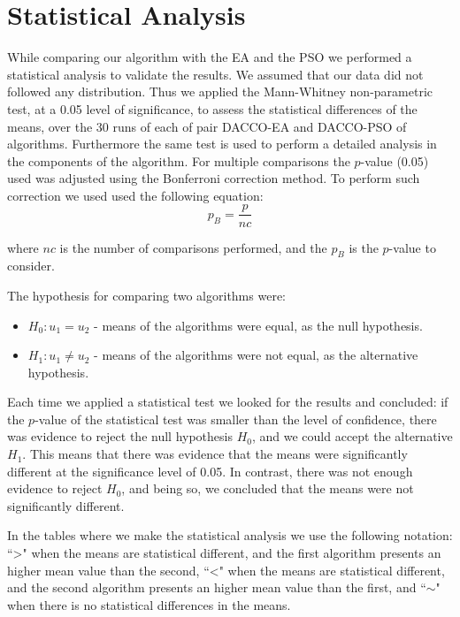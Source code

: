 \section*{Statistical Analysis}
\label{sec:statistical_analysis}
While comparing our algorithm with the EA and the PSO we performed a statistical analysis to validate the results. We assumed that our data did not followed any distribution. Thus we applied the Mann-Whitney non-parametric test, at a 0.05 level of significance, to assess the statistical differences of the means, over the 30 runs of each of pair DACCO-EA and DACCO-PSO of algorithms. Furthermore the same test is used to perform a detailed analysis in the components of the algorithm. For multiple comparisons the $p$-value (0.05) used was adjusted using the Bonferroni correction method. To perform such correction we used used the following equation:
\begin{equation}
	p_B = \frac{p} {nc}
\end{equation}

where $nc$ is the number of comparisons performed, and the $p_B$ is the $p$-value to consider.

The hypothesis for comparing two algorithms were:
\begin{itemize}
	\item $H_{0} : u_1 = u_2$ - means of the algorithms were equal, as the null hypothesis.
	\item $H_{1} : u_1 \neq u_2$ - means of the algorithms were not equal, as the alternative hypothesis.
\end{itemize}

Each time we applied a statistical test we looked for the results and concluded: if the $p$-value of the statistical test was smaller than the level of confidence, there was evidence to reject the null hypothesis $H_{0}$, and we could accept the alternative $H_{1}$. This means that there was evidence that the means were significantly different  at the significance level of 0.05. In contrast, there was not enough evidence to reject $H_{0}$, and being so, we concluded that the means were not significantly different.

In the tables where we make the statistical analysis we use the following notation: ``>" when the means are statistical different, and the first algorithm presents an higher mean value than the second, ``<"  when the means are statistical different, and the second algorithm presents an higher mean value than the first, and ``$\sim$" when there is no statistical differences in the means.



